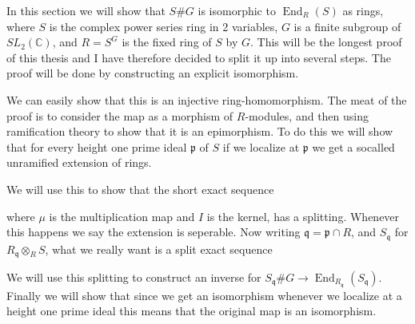 \documentclass[11pt, a4paper, english]{article}
\numberwithin{prop}{section}
\numberwithin{lemma}{section}
\numberwithin{theorem}{section}
\numberwithin{defin}{section}
\numberwithin{example}{section}
\newcommand{\C}{\mathbb{C}}
\DeclareMathOperator{\End}{End}
\begin{document}
In this section we will show that $S\#G$ is isomorphic to $\End_R(S)$ as rings, where $S$ is the complex power series ring in 2 variables, $G$ is a finite subgroup of $SL_2(\C)$, and $R = S^G$ is the fixed ring of $S$ by $G$. This will be the longest proof of this thesis and I have therefore decided to split it up into several steps. The proof will be done by constructing an explicit isomorphism.
\begin{center}
\end{center}
We can easily show that this is an injective ring-homomorphism. The meat of the proof is to consider the map as a morphism of $R$-modules, and then using ramification theory to show that it is an epimorphism. To do this we will show that for every height one prime ideal $\mathfrak{p}$ of $S$ if we localize at $\mathfrak{p}$ we get a socalled unramified extension of rings.
\begin{center}
\end{center}
We will use this to show that the short exact sequence
\begin{center}
\end{center}
where $\mu$ is the multiplication map and $I$ is the kernel, has a splitting. Whenever this happens we say the extension is seperable. Now writing $\mathfrak{q} = \mathfrak{p} \cap R$, and $S_\mathfrak{q}$ for $R_\mathfrak{q} \otimes_R S$, what we really want is a split exact sequence
\begin{center}
\end{center}
We will use this splitting to construct an inverse for $S_\mathfrak{q}\#G \to \End_{R_{\mathfrak{q}}}(S_\mathfrak{q})$. Finally we will show that since we get an isomorphism whenever we localize at a height one prime ideal this means that the original map is an isomorphism.
\end{document}
